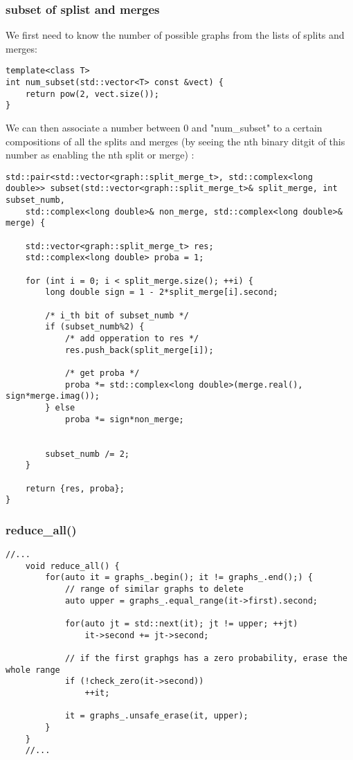 \documentclass[11pt]{article}
\begin{document}
\subsubsection{subset of splist and merges}

We first need to know the number of possible graphs from the lists of splits and merges:

\begin{lstlisting}[style=CStyle]
template<class T>
int num_subset(std::vector<T> const &vect) {
	return pow(2, vect.size());
}
\end{lstlisting}

We can then associate a number between 0 and "num\_subset" to a certain compositions of all the splits and merges (by seeing the nth binary ditgit of this number as enabling the nth split or merge) :

\begin{lstlisting}[style=CStyle]
std::pair<std::vector<graph::split_merge_t>, std::complex<long double>> subset(std::vector<graph::split_merge_t>& split_merge, int subset_numb,
	std::complex<long double>& non_merge, std::complex<long double>& merge) {
	
	std::vector<graph::split_merge_t> res;
	std::complex<long double> proba = 1;

	for (int i = 0; i < split_merge.size(); ++i) {
		long double sign = 1 - 2*split_merge[i].second;

		/* i_th bit of subset_numb */
		if (subset_numb%2) {
			/* add opperation to res */
			res.push_back(split_merge[i]);

			/* get proba */
			proba *= std::complex<long double>(merge.real(), sign*merge.imag());
		} else
			proba *= sign*non_merge;


		subset_numb /= 2;
	}

	return {res, proba};
}
\end{lstlisting}

\subsubsection{reduce\_all()}

\begin{lstlisting}[style=CStyle]
	//...
	void reduce_all() {
		for(auto it = graphs_.begin(); it != graphs_.end();) {
			// range of similar graphs to delete
			auto upper = graphs_.equal_range(it->first).second;

			for(auto jt = std::next(it); jt != upper; ++jt)
		    	it->second += jt->second;

			// if the first graphgs has a zero probability, erase the whole range
			if (!check_zero(it->second))
				++it;
			
			it = graphs_.unsafe_erase(it, upper);
		}
	}
	//...
\end{lstlisting}
\end{document}
